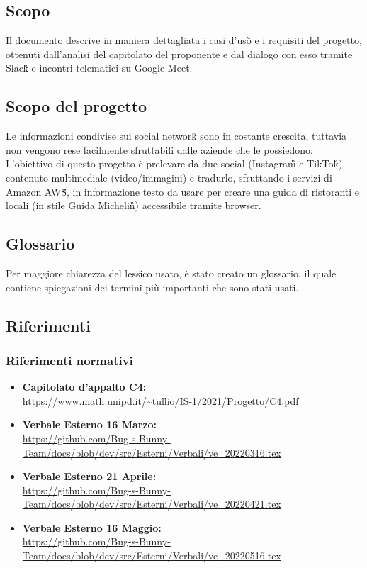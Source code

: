 \subsection{Scopo}
Il documento descrive in maniera dettagliata i casi d'uso\G{} e i requisiti del progetto, ottenuti dall'analisi del capitolato del proponente \proponente{} e dal dialogo con esso tramite Slack\G{} e incontri telematici su Google Meet\G{}.

\subsection{Scopo del progetto}
Le informazioni condivise sui social network\G{} sono in costante crescita, tuttavia non vengono rese facilmente sfruttabili dalle aziende che le possiedono. L'obiettivo di questo progetto è prelevare da due social (Instagram\G{} e TikTok\G{}) contenuto multimediale (video/immagini) e tradurlo, sfruttando i servizi di Amazon AWS\G{}, in informazione testo da usare per creare una guida di ristoranti e locali (in stile Guida Michelin\G{}) accessibile tramite browser. 

\subsection{Glossario}
Per maggiore chiarezza del lessico usato, è stato creato un glossario, il quale 
contiene spiegazioni dei termini più importanti che sono stati usati.

\subsection{Riferimenti}
\subsubsection{Riferimenti normativi}
\begin{itemize}
	\item
	{\textbf{Capitolato d'appalto C4:}}\\\url{https://www.math.unipd.it/~tullio/IS-1/2021/Progetto/C4.pdf}
    \item
    {\textbf{Verbale Esterno 16 Marzo:}}\\\url{https://github.com/Bug-s-Bunny-Team/docs/blob/dev/src/Esterni/Verbali/ve_20220316.tex}
    \item
	{\textbf{Verbale Esterno 21 Aprile:}}\\\url{https://github.com/Bug-s-Bunny-Team/docs/blob/dev/src/Esterni/Verbali/ve_20220421.tex}
    \item
	{\textbf{Verbale Esterno 16 Maggio:}}\\\url{https://github.com/Bug-s-Bunny-Team/docs/blob/dev/src/Esterni/Verbali/ve_20220516.tex}

\end{itemize}
